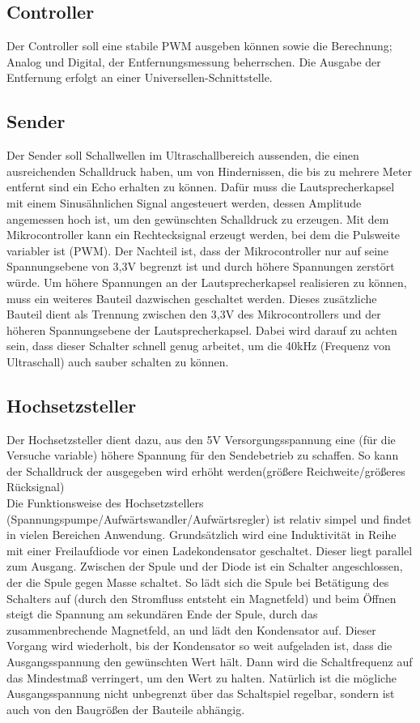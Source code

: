 \subsection{Controller}
Der Controller soll eine stabile PWM ausgeben können sowie die Berechnung; Analog und Digital, der Entfernungsmessung beherrschen. Die Ausgabe der Entfernung erfolgt an einer Universellen-Schnittstelle. 

\subsection{Sender}
Der Sender soll Schallwellen im Ultraschallbereich aussenden, die einen ausreichenden Schalldruck haben, um von Hindernissen, die bis zu mehrere Meter entfernt sind ein Echo erhalten zu können.
Dafür muss die Lautsprecherkapsel mit einem Sinusähnlichen Signal angesteuert werden, dessen Amplitude angemessen hoch ist, um den gewünschten Schalldruck zu erzeugen. Mit dem Mikrocontroller kann ein Rechtecksignal erzeugt werden, bei dem die Pulsweite variabler ist (PWM). Der Nachteil ist, dass der Mikrocontroller nur auf seine Spannungsebene von 3,3V begrenzt ist und durch höhere Spannungen zerstört würde.
Um höhere Spannungen an der Lautsprecherkapsel realisieren zu können, muss ein weiteres Bauteil dazwischen geschaltet werden. Dieses zusätzliche Bauteil dient als Trennung zwischen den 3,3V des Mikrocontrollers und der höheren Spannungsebene der Lautsprecherkapsel. Dabei wird darauf zu achten sein, dass dieser Schalter schnell genug arbeitet, um die 40kHz (Frequenz von Ultraschall) auch sauber schalten zu können.

\subsection{Hochsetzsteller}
Der Hochsetzsteller dient dazu, aus den 5V Versorgungsspannung eine (für die Versuche variable) höhere Spannung für den Sendebetrieb zu schaffen. So kann der Schalldruck der ausgegeben wird erhöht werden(größere Reichweite/größeres Rücksignal)\\
Die Funktionsweise des Hochsetzstellers (Spannungspumpe/Aufwärtswandler/Aufwärtsregler) ist relativ simpel und findet in vielen Bereichen Anwendung. Grundsätzlich wird eine Induktivität in Reihe mit einer Freilaufdiode vor einen Ladekondensator geschaltet. Dieser liegt parallel zum Ausgang. Zwischen der Spule und der Diode ist ein Schalter angeschlossen, der die Spule gegen Masse schaltet. So lädt sich die Spule bei Betätigung des Schalters auf (durch den Stromfluss entsteht ein Magnetfeld) und beim Öffnen steigt die Spannung am sekundären Ende der Spule, durch das zusammenbrechende Magnetfeld, an und lädt den Kondensator auf. Dieser Vorgang wird wiederholt, bis der Kondensator so weit aufgeladen ist, dass die Ausgangsspannung den gewünschten Wert hält. Dann wird die Schaltfrequenz auf das Mindestmaß verringert, um den Wert zu halten. Natürlich ist die mögliche Ausgangsspannung nicht unbegrenzt über das Schaltspiel regelbar, sondern ist auch von den Baugrößen der Bauteile abhängig. 

